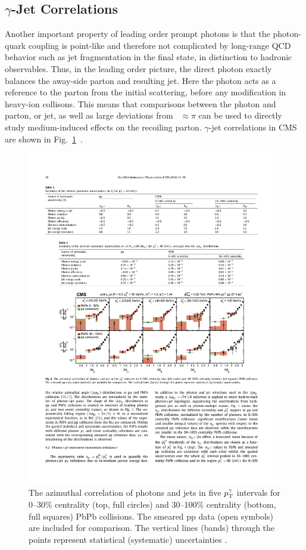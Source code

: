 \subsection{$\gamma$-Jet Correlations}
\label{sec:intro_gj}
Another important property of leading order prompt photons is that the photon-quark coupling is point-like and therefore not complicated by long-range QCD behavior such as jet fragmentation in the final state, in distinction to hadronic observables. Thus, in the leading order picture, the direct photon exactly balances the away-side parton and resulting jet. Here the photon acts as a reference to the parton from the initial scattering, before any modification in heavy-ion collisons. This means that comparisons between the photon and parton, or jet, as well as large deviations from \deltaphi~$\approx\pi$ can be used to directly study medium-induced effects on the recoiling parton. $\gamma$-jet correlations in CMS are shown in Fig.~\ref{fig:cms_gj_correlations}~\cite{Sirunyan2018}.


\begin{figure}[htpb]
  \centering
  \includegraphics[width=0.99\textwidth]{Introduction/cms_gj_correlations.pdf}
  \caption{The azimuthal correlation of photons and jets in five $p_{\mathrm{T}}^\gamma$ intervals for 0–30\% centrality (top, full circles) and 30–100\% centrality (bottom, full squares) PbPb collisions. The smeared pp data (open symbols) are included for comparison. The vertical lines (bands) through the points represent statistical (systematic) uncertainties \cite{Sirunyan2018}.}
  \label{fig:cms_gj_correlations}
\end{figure}


